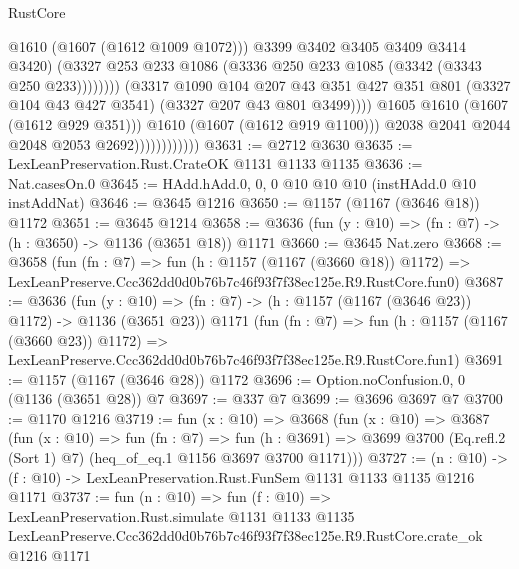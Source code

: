 \begin{lexlean}{RustCore}
\begin{coremodule}
                                                @1610
                                                (@1607 (@1612 @1009 @1072)))
                                              @3399
                                              @3402
                                              @3405
                                              @3409
                                              @3414
                                              @3420)
                                            (@3327
                                              @253
                                              @233
                                              @1086
                                              (@3336 @250 @233 @1085 (@3342 (@3343 @250 @233))))))))
                                    (@3317
                                      @1090
                                      @104
                                      @207
                                      @43
                                      @351
                                      @427
                                      @351
                                      @801
                                      (@3327 @104 @43 @427 @3541)
                                      (@3327 @207 @43 @801 @3499))))
                                @1605
                                @1610
                                (@1607 (@1612 @929 @351)))
                              @1610
                              (@1607 (@1612 @919 @1100)))
                            @2038
                            @2041
                            @2044
                            @2048
                            @2053
                            @2692))))))))))))
@3631 := @2712 @3630
@3635 := LexLeanPreservation.Rust.CrateOK @1131 @1133 @1135
@3636 := Nat.casesOn.{0}
@3645 := HAdd.hAdd.{0, 0, 0} @10 @10 @10 (instHAdd.{0} @10 instAddNat)
@3646 := @3645 @1216
@3650 := @1157 (@1167 (@3646 @18)) @1172
@3651 := @3645 @1214
@3658 := @3636 (fun (y : @10) => (fn : @7) -> (h : @3650) -> @1136 (@3651 @18)) @1171
@3660 := @3645 Nat.zero
@3668 := @3658
    (fun (fn : @7) =>
    fun (h : @1157 (@1167 (@3660 @18)) @1172) =>
    LexLeanPreserve.Ccc362dd0d0b76b7c46f93f7f38ec125e.R9.RustCore.fun0)
@3687 := @3636
    (fun (y : @10) => (fn : @7) -> (h : @1157 (@1167 (@3646 @23)) @1172) -> @1136 (@3651 @23))
    @1171
    (fun (fn : @7) =>
    fun (h : @1157 (@1167 (@3660 @23)) @1172) =>
    LexLeanPreserve.Ccc362dd0d0b76b7c46f93f7f38ec125e.R9.RustCore.fun1)
@3691 := @1157 (@1167 (@3646 @28)) @1172
@3696 := Option.noConfusion.{0, 0} (@1136 (@3651 @28)) @7
@3697 := @337 @7
@3699 := @3696 @3697 @7
@3700 := @1170 @1216
@3719 := fun (x : @10) =>
  @3668
    (fun (x : @10) =>
    @3687
      (fun (x : @10) =>
      fun (fn : @7) =>
      fun (h : @3691) =>
      @3699 @3700 (Eq.refl.{2} (Sort 1) @7) (heq_of_eq.{1} @1156 @3697 @3700 @1171)))
@3727 := (n : @10) -> (f : @10) -> LexLeanPreservation.Rust.FunSem @1131 @1133 @1135 @1216 @1171
@3737 := fun (n : @10) =>
  fun (f : @10) =>
  LexLeanPreservation.Rust.simulate
    @1131
    @1133
    @1135
    LexLeanPreserve.Ccc362dd0d0b76b7c46f93f7f38ec125e.R9.RustCore.crate_ok
    @1216
    @1171
\end{coremodule}
\end{lexlean}
